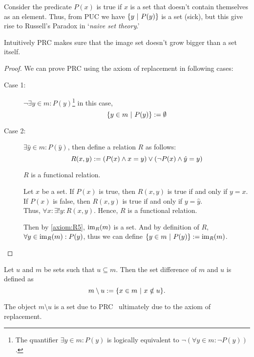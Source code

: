 Consider the predicate \(P(x)\) is true if \(x\) is a set that doesn't contain themselves as an element. Thus, from PUC we have \(\qty{y \ \middle|\ P(y)}\) is a set (sick), but this give rise to Russell's Paradox in `\emph{naive set theory}.'

Intuitively PRC makes sure that the image set doesn't grow bigger than a set itself.
\begin{proof}
	We can prove PRC using the axiom of replacement in following cases:
	\begin{description}
		\item[Case 1:] \(\lnot \exists y \in m: P(y)\)\footnote{The quantifier \(\exists y \in m: P(y)\) is logically equivalent to \(\lnot(\forall y \in m: \lnot P(y))\).} in this case,
		      \begin{equation*}
			      \qty{y \in m \ \middle|\ P(y)} := \emptyset
		      \end{equation*}

		\item[Case 2:] \(\exists \hat{y} \in m: P(\hat{y})\), then define a relation \(R\) as follows:
		      \begin{equation*}
			      R(x, y) := \qty(P(x) \land x = y) \lor \qty(\lnot P(x) \land \hat{y} = y)
		      \end{equation*}
		      \begin{claim}
			      \(R\) is a functional relation.
		      \end{claim}
		      \begin{Proof}
			      Let \(x\) be a set. If \(P(x)\) is true, then \(R(x, y)\) is true if and only if \(y = x\). If \(P(x)\) is false, then \(R(x, y)\) is true if and only if \(y = \hat{y}\). \\
			      Thus, \(\forall x: \exists! y: R(x, y)\). Hence, \(R\) is a functional relation.
		      \end{Proof}
		      Then by \cref{axiom:R5}, \(\operatorname{im}_R(m)\) is a set. And by definition of \(R\), \(\forall y \in \operatorname{im}_R(m): P(y)\)\footnotemark, thus we can define \(\qty{y \in m \ \middle|\ P(y)} := \operatorname{im}_R(m)\).
	\end{description}
\end{proof}

\begin{definition}
	Let \(u\) and \(m\) be sets such that \(u \subseteq m\). Then the set difference of \(m\) and \(u\) is defined as
	\begin{equation}
		m \setminus u := \qty{x \in m \ \middle|\ x \notin u}.
	\end{equation}
\end{definition}
The object \(m \setminus u\) is a set due to PRC \ie\ ultimately due to the axiom of replacement.

